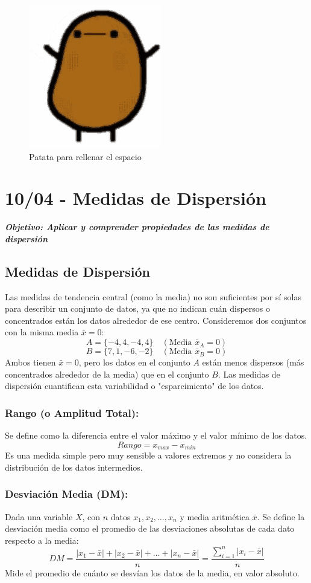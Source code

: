 \documentclass[12pt, letterpaper]{article}
\begin{document}
\begin{figure}[htbp]
	\centering
	\includegraphics[width=0.35\linewidth]{patata}
	\caption{Patata para rellenar el espacio}
	\label{fig:patata}
\end{figure}
\newpage

\section{10/04 - Medidas de Dispersión}
\textbf{\textit{Objetivo: Aplicar y comprender propiedades de las medidas de dispersión}}
\subsection{Medidas de Dispersión}
Las medidas de tendencia central (como la media) no son suficientes por sí solas para describir un conjunto de datos, ya que no indican cuán dispersos o concentrados están los datos alrededor de ese centro. Consideremos dos conjuntos con la misma media $\bar{x}=0$:
\[ A = \{-4, 4, -4, 4\} \quad (\text{Media } \bar{x}_A = 0) \]
\[ B = \{7, 1, -6, -2\} \quad (\text{Media } \bar{x}_B = 0) \]
Ambos tienen $\bar{x}=0$, pero los datos en el conjunto $A$ están menos dispersos (más concentrados alrededor de la media) que en el conjunto $B$. Las medidas de dispersión cuantifican esta variabilidad o "esparcimiento" de los datos.

\subsubsection{Rango (o Amplitud Total):}
Se define como la diferencia entre el valor máximo y el valor mínimo de los datos.
\[ Rango = x_{max} - x_{min} \]
Es una medida simple pero muy sensible a valores extremos y no considera la distribución de los datos intermedios.

\subsubsection{Desviación Media (DM):}
Dada una variable $X$, con $n$ datos $x_1, x_2, \dots, x_n$ y media aritmética $\bar{x}$. Se define la desviación media como el promedio de las desviaciones absolutas de cada dato respecto a la media:
\[ DM = \frac{|x_1-\bar{x}|+|x_2-\bar{x}|+\dots+|x_n-\bar{x}|}{n} = \frac{\sum_{i=1}^{n} |x_i - \bar{x}|}{n} \]
Mide el promedio de cuánto se desvían los datos de la media, en valor absoluto.
\end{document}

